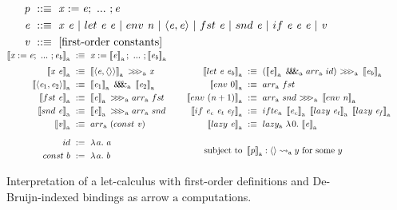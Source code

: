 \documentclass[preprint]{sigplanconf}
\newcommand{\smallmathfont}{\fontsize{7.5}{9}\selectfont}
\newcommand{\arrow}{\rightsquigarrow}
\newcommand{\arrowarr}{\ensuremath{arr}}
\newcommand{\arrowcomp}{\ensuremath{{>}\mspace{-6mu}{>}\mspace{-6mu}{>}}}
\newcommand{\arrowpair}{\ensuremath{\mathit{\&\mspace{-7.5mu}\&\mspace{-7.5mu}\&}}}
\newcommand{\arrowif}{\ensuremath{ifte}}
\newcommand{\arrowlazy}{\ensuremath{lazy}}
\newcommand{\gen}{_\mathrm{a}}
\begin{document}
\begin{figure*}[!tb]\centering
\smallmathfont
\begin{align*}
	\mathit{p} &\ ::\equiv \ \mathit{x := e};\ ...\ ; \mathit{e}
\\
	\mathit{e} &\ ::\equiv \ \mathit{x~e}\ |\ let~\mathit{e~e}\ |\ env~\mathit{n}\ |\ \mathit{\pair{e,e}}\ |\ fst~\mathit{e}\ |\ snd~\mathit{e}\ |\ if~\mathit{e~e~e}\ |\ \mathit{v}
\\
	\mathit{v} &\ ::\equiv \ \text{[first-order constants]}
\\[-6pt]
\end{align*}
\begin{align*}
\begin{aligned}[t]
	\meaningof{\mathit{x} := \mathit{e};\ ...\ ; \mathit{e_b}}\gen &\ :\equiv\
		\mathit{x} := \meaningof{\mathit{e}}\gen;\ ...\ ; \meaningof{\mathit{e_b}}\gen
\\[3pt]
	\meaningof{\mathit{x}~\mathit{e}}\gen &\ :\equiv\
		\meaningof{\pair{\mathit{e},\pair{}}}\gen~\arrowcomp\gen~\mathit{x}
\\
	\meaningof{\pair{\mathit{e}_1,\mathit{e}_2}}\gen &\ :\equiv\
		\meaningof{\mathit{e}_1}\gen~\arrowpair\gen~\meaningof{\mathit{e}_2}\gen
\\
	\meaningof{fst~\mathit{e}}\gen &\ :\equiv\
		\meaningof{\mathit{e}}\gen~\arrowcomp\gen~\arrowarr\gen~fst
\\
	\meaningof{snd~\mathit{e}}\gen &\ :\equiv\
		\meaningof{\mathit{e}}\gen~\arrowcomp\gen~\arrowarr\gen~snd
\\
	\meaningof{\mathit{v}}\gen &\ :\equiv\ \arrowarr\gen~(const~\mathit{v})
\\[6pt]
	id &\ := \ \fun{a} a
\\
	const~b &\ := \ \fun{a} b
\\
\end{aligned}
&\tab\tab\ 
\begin{aligned}[t]
\\[3pt]
	\meaningof{let~\mathit{e}~\mathit{e_b}}\gen &\ :\equiv\ 
		(\meaningof{\mathit{e}}\gen~\arrowpair\gen~\arrowarr\gen~id)~
			\arrowcomp\gen~
		\meaningof{\mathit{e_b}}\gen
\\
	\meaningof{env~0}\gen &\ :\equiv\ \arrowarr\gen~fst
\\
	\meaningof{env~(\mathit{n}+1)}\gen &\ :\equiv\ \arrowarr\gen~snd~\arrowcomp\gen~\meaningof{env~\mathit{n}}\gen
\\
	\meaningof{if~\mathit{e_c}~\mathit{e_t}~\mathit{e_f}}\gen &\ :\equiv\
		\arrowif\gen~
			\meaningof{\mathit{e_c}}\gen~
			\meaningof{lazy~\mathit{e_t}}\gen~
			\meaningof{lazy~\mathit{e_f}}\gen
\\
	\meaningof{lazy~\mathit{e}}\gen &\ :\equiv\ \arrowlazy\gen~\fun{0}{\meaningof{\mathit{e}}\gen}
\\
\\
	\text{subject to} &\ \meaningof{\mathit{p}}\gen : \pair{} \arrow\gen y \ \text{for some $y$}
\end{aligned}
\end{align*}
\bottomhrule
\caption[ ]{Interpretation of a let-calculus with first-order definitions and De-Bruijn-indexed bindings as arrow $\mathrm{a}$ computations.
}
\label{fig:semantic-function}
\end{figure*}
\end{document}
